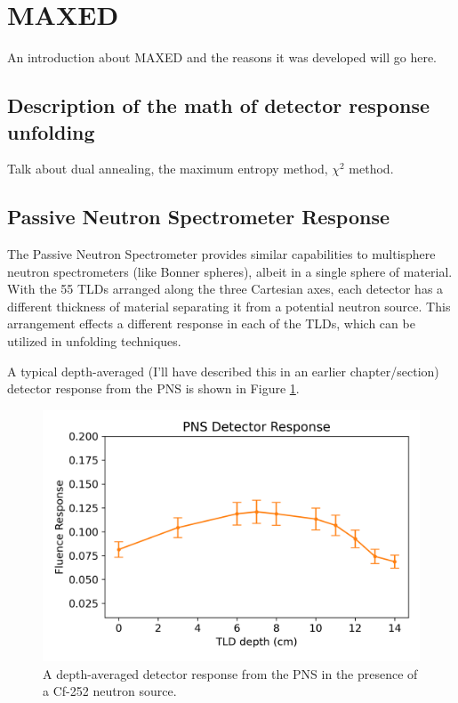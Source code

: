 \section{MAXED}\label{MAXED_description}
An introduction about MAXED and the reasons it was developed will go here.

\subsection{Description of the math of detector response unfolding}\label{MAXED_math}
Talk about dual annealing, the maximum entropy method, $\chi^2$ method.

\subsection{Passive Neutron Spectrometer Response}\label{PNS_response}
The Passive Neutron Spectrometer provides similar capabilities to multisphere neutron spectrometers (like Bonner spheres), albeit in a single sphere of material. With the 55 TLDs arranged along the three Cartesian axes, each detector has a different thickness of material separating it from a potential neutron source. This arrangement effects a different response in each of the TLDs, which can be utilized in unfolding techniques.

A typical depth-averaged (I'll have described this in an earlier chapter/section) detector response from the PNS is shown in Figure \ref{example_PNS_dr}.

\begin{figure}[H]
  \centering
  \includegraphics[scale=0.9]{images/Example_PNS_dr.png}
  \caption{A depth-averaged detector response from the PNS in the presence of a Cf-252 neutron source.} \label{example_PNS_dr}
\end{figure}

